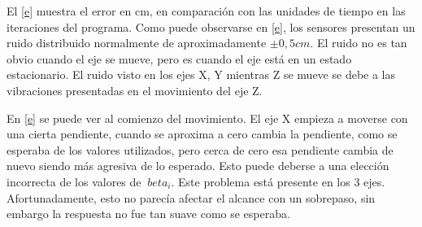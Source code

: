 El \cref{e} muestra el error en cm, en comparación con las unidades de tiempo en las iteraciones del programa. Como puede observarse en \cref{e}, los sensores presentan un ruido distribuido normalmente de aproximadamente $ \pm 0,5 cm $. El ruido no es tan obvio cuando el eje se mueve, pero es cuando el eje está en un estado estacionario. El ruido visto en los ejes X, Y mientras Z se mueve se debe a las vibraciones presentadas en el movimiento del eje Z.



En \cref{e} se puede ver al comienzo del movimiento. El eje X empieza a moverse con una cierta pendiente, cuando se aproxima a cero cambia la pendiente, como se esperaba de los valores utilizados, pero cerca de cero esa pendiente cambia de nuevo siendo más agresiva de lo esperado. Esto puede deberse a una elección incorrecta de los valores de $ \ beta_i $. Este problema está presente en los 3 ejes. Afortunadamente, esto no parecía afectar el alcance con un sobrepaso, sin embargo la respuesta no fue tan suave como se esperaba.


